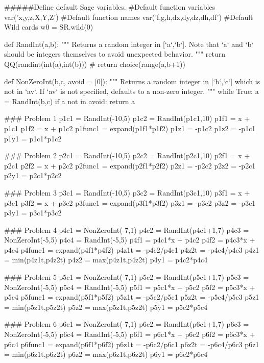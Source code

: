 \documentclass{ximeraXloud}
\begin{document}
\begin{sagesilent}
#####Define default Sage variables.
#Default function variables
var('x,y,z,X,Y,Z')
#Default function names
var('f,g,h,dx,dy,dz,dh,df')
#Default Wild cards
w0 = SR.wild(0)

def RandInt(a,b):
    """ Returns a random integer in [`a`,`b`]. Note that `a` and `b` should be integers themselves to avoid unexpected behavior.
    """
    return QQ(randint(int(a),int(b)))
    # return choice(range(a,b+1))

def NonZeroInt(b,c, avoid = [0]):
    """ Returns a random integer in [`b`,`c`] which is not in `av`. 
        If `av` is not specified, defaults to a non-zero integer.
    """
    while True:
        a = RandInt(b,c)
        if a not in avoid:
            return a

\end{sagesilent}
\begin{sagesilent}
### Problem 1
p1c1 = RandInt(-10,5)
p1c2 = RandInt(p1c1,10)
p1f1 = x + p1c1
p1f2 = x + p1c2
p1func1 = expand(p1f1*p1f2)
p1z1 = -p1c2
p1z2 = -p1c1
p1y1 = p1c1*p1c2


### Problem 2
p2c1 = RandInt(-10,5)
p2c2 = RandInt(p2c1,10)
p2f1 = x + p2c1
p2f2 = x + p2c2
p2func1 = expand(p2f1*p2f2)
p2z1 = -p2c2
p2z2 = -p2c1
p2y1 = p2c1*p2c2


### Problem 3
p3c1 = RandInt(-10,5)
p3c2 = RandInt(p3c1,10)
p3f1 = x + p3c1
p3f2 = x + p3c2
p3func1 = expand(p3f1*p3f2)
p3z1 = -p3c2
p3z2 = -p3c1
p3y1 = p3c1*p3c2


### Problem 4
p4c1 = NonZeroInt(-7,1)
p4c2 = RandInt(p4c1+1,7)
p4c3 = NonZeroInt(-5,5)
p4c4 = RandInt(-5,5)
p4f1 = p4c1*x + p4c2
p4f2 = p4c3*x + p4c4
p4func1 = expand(p4f1*p4f2)
p4z1t = -p4c2/p4c1
p4z2t = -p4c4/p4c3
p4z1 = min(p4z1t,p4z2t)
p4z2 = max(p4z1t,p4z2t)
p4y1 = p4c2*p4c4


### Problem 5
p5c1 = NonZeroInt(-7,1)
p5c2 = RandInt(p5c1+1,7)
p5c3 = NonZeroInt(-5,5)
p5c4 = RandInt(-5,5)
p5f1 = p5c1*x + p5c2
p5f2 = p5c3*x + p5c4
p5func1 = expand(p5f1*p5f2)
p5z1t = -p5c2/p5c1
p5z2t = -p5c4/p5c3
p5z1 = min(p5z1t,p5z2t)
p5z2 = max(p5z1t,p5z2t)
p5y1 = p5c2*p5c4


### Problem 6
p6c1 = NonZeroInt(-7,1)
p6c2 = RandInt(p6c1+1,7)
p6c3 = NonZeroInt(-5,5)
p6c4 = RandInt(-5,5)
p6f1 = p6c1*x + p6c2
p6f2 = p6c3*x + p6c4
p6func1 = expand(p6f1*p6f2)
p6z1t = -p6c2/p6c1
p6z2t = -p6c4/p6c3
p6z1 = min(p6z1t,p6z2t)
p6z2 = max(p6z1t,p6z2t)
p6y1 = p6c2*p6c4



\end{sagesilent}
\end{document}

